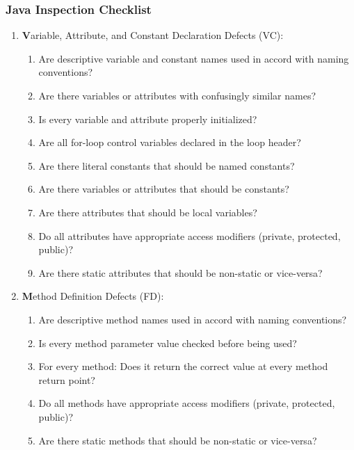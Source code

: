 \subsubsection{Java Inspection Checklist}
\begin{enumerate}
\item {\textbf Variable, Attribute, and Constant Declaration Defects (VC):}
\begin{enumerate}
\item Are descriptive variable and constant names used in accord with naming
  conventions?
\item Are there variables or attributes with confusingly similar names?
\item Is every variable and attribute properly initialized?
\item Are all for-loop control variables declared in the loop header?
\item Are there literal constants that should be named constants?
\item Are there variables or attributes that should be constants?
\item Are there attributes that should be local variables?
\item Do all attributes have appropriate access modifiers (private, protected,
  public)?
\item Are there static attributes that should be non-static or vice-versa?
\end{enumerate}
\ifslides
\newpage
\fi
\item {\textbf Method Definition Defects (FD):}
  \begin{enumerate}
  \item Are descriptive method names used in accord with naming conventions?
  \item Is every method parameter value checked before being used?
  \item For every method: Does it return the correct value at every method
  return point?
  \item Do all methods have appropriate access modifiers (private, protected,
  public)?
  \item Are there static methods that should be non-static or vice-versa?
  \end{enumerate}

\end{enumerate}
